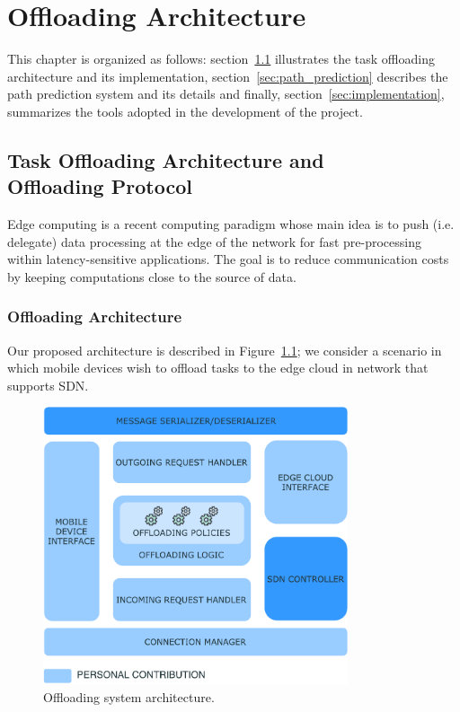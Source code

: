 \chapter{Offloading Architecture}
\label{ch:contribution}

This chapter is organized as follows: section~\ref{sec:task_off} illustrates the task offloading architecture and its implementation, section~\ref{sec:path_prediction} describes the path prediction system and its details and finally, section~\ref{sec:implementation}, summarizes the tools adopted in the development of the project.

\section{Task Offloading Architecture and~\\Offloading Protocol}
\label{sec:task_off}
Edge computing is a recent computing paradigm whose main idea is to push (i.e. delegate) data processing at the edge of the network for fast pre-processing within latency-sensitive applications. The goal is to reduce communication costs by keeping computations close to the source of data. 

\subsection{Offloading Architecture}
\label{sec:architecture}
Our proposed architecture is described in Figure~\ref{fig:offloading_system_arch}; we consider a scenario in which mobile devices wish to offload tasks to the edge cloud in network that supports SDN.

\begin{figure}[]
\centering
\includegraphics[width=0.8\textwidth]{img/off_sys_arch}
\caption{Offloading system architecture.}
\label{fig:offloading_system_arch}
\end{figure}

